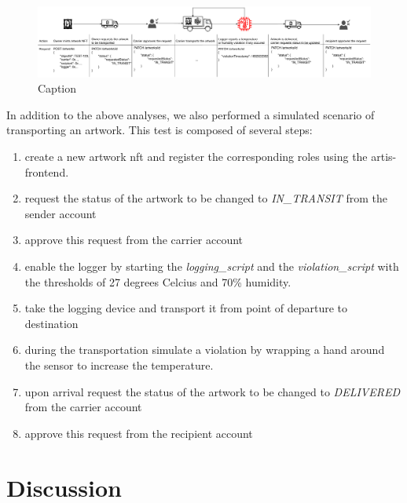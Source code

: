 \begin{figure}
    \centering
    \includegraphics[width=\textwidth]{diagrams/evaluation_scenario.drawio.pdf}
    \caption{Caption}
    \label{fig:enter-label}
\end{figure}


In addition to the above analyses, we also performed a simulated scenario of transporting an artwork. This test is composed of several steps:

\begin{enumerate}
    \item create a new artwork \gls{nft} and register the corresponding roles using the artis-frontend.
    \item request the status of the artwork to be changed to \textit{IN\_TRANSIT} from the sender account
    \item approve this request from the carrier account
    \item enable the logger by starting the \textit{logging\_script} and the \textit{violation\_script} with the thresholds of 27 degrees Celcius and 70\% humidity.
    \item take the logging device and transport it from point of departure to destination
    \item during the transportation simulate a violation by wrapping a hand around the sensor to increase the temperature.
    \item upon arrival request the status of the artwork to be changed to \textit{DELIVERED} from the carrier account
    \item approve this request from the recipient account
\end{enumerate}

\section{Discussion}
\label{sec:eval_discussion}
